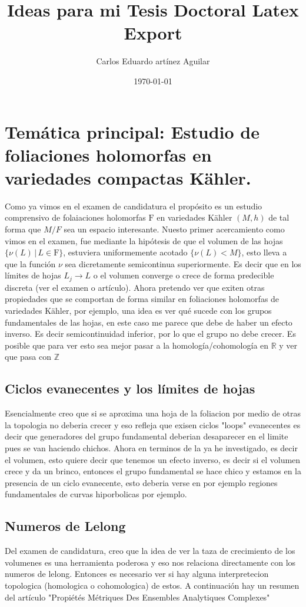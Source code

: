 \documentclass[letterpaper]{article}
\author{Carlos Eduardo artínez Aguilar}
\date{\today}
\title{Ideas para mi Tesis Doctoral Latex Export}
\newcommand{\zah}{\ensuremath{ \mathbb Z }}
\newcommand{\re}{\ensuremath{\mathbb R }}
\begin{document}
\maketitle
\tableofcontents


\section{Temática principal: Estudio de foliaciones holomorfas en variedades compactas Kähler.}
\label{sec:org4b05e52}

\noindent Como ya vimos en el examen de candidatura el propósito es un estudio comprensivo de folaiaciones holomorfas \(\mathrm{F}\) en variedades Kähler \((M,h)\) de tal forma que \(M/F\) sea un espacio interesante. Nuesto primer acercamiento como vimos en el examen, fue mediante la hipótesis de que el volumen de las hojas \(\{ \nu(L) \,|\,L\in \mathrm{F}\}\), estuviera uniformemente acotado \(\{\nu(L) < M\}\), esto lleva a que la función \(\nu\) sea dicretamente semicontinua superiormente. Es decir que en los límites de hojas \(L_j\rightarrow L\) o el volumen converge o crece de forma predecible discreta (ver el examen o artículo). Ahora pretendo ver que exiten otras propiedades que se comportan de forma similar en foliaciones holomorfas de variedades Kähler, por ejemplo, una idea es ver qué sucede con los grupos fundamentales de las hojas, en este caso me parece que debe de haber un efecto inverso. Es decir semicontinuidad inferior, por lo que el grupo no debe crecer. Es posible que para ver esto sea mejor pasar a la homología/cohomología en \(\re\) y ver que pasa con \(\zah\)

\subsection{Ciclos evanecentes y los límites de hojas}
\label{sec:orgc504c2d}
Esencialmente creo que si se aproxima una hoja de la foliacion por medio de otras la topologia no deberia crecer y eso refleja que exisen ciclos "loops" evanecentes es decir que generadores del grupo fundamental deberian desaparecer en el limite pues se van haciendo chichos. Ahora en terminos de la ya he investigado, es decir el volumen, esto quiere decir que tenemos un efecto inverso, es decir si el volumen crece y da un brinco, entonces el grupo fundamental se hace chico y estamos en la presencia de un ciclo evanecente, esto deberia verse en por ejemplo regiones fundamentales de curvas hiporbolicas por ejemplo.
\subsection{Numeros de Lelong}
\label{sec:org51e0013}
Del examen de candidatura, creo que la idea de ver la taza de crecimiento de los volumenes es una herramienta poderosa y eso nos relaciona directamente con los numeros de lelong. Entonces es necesario ver si hay alguna interpretecion topologica (homologica o cohomologica) de estos. A continuación hay un resumen del artículo "Propiétés Métriques Des Ensembles Analytiques Complexes"
\end{document}
